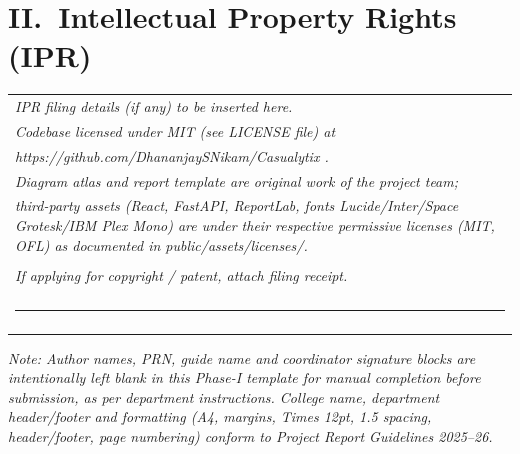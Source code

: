 \documentclass[12pt,a4paper,oneside]{report}
\newcommand{\blankline}[1][3cm]{\rule{#1}{0.4pt}}
\begin{document}
\section*{II.\ Intellectual Property Rights (IPR)}

\begin{center}
\begin{tabular}{|p{14cm}|}
\hline
\textit{IPR filing details (if any) to be inserted here.}\\
\textit{Codebase licensed under MIT (see LICENSE file) at}\\
\textit{https://github.com/DhananjaySNikam/Casualytix .}\\
\textit{Diagram atlas and report template are original work of the project team;}\\
\textit{third-party assets (React, FastAPI, ReportLab, fonts Lucide/Inter/Space Grotesk/IBM Plex Mono) are under their respective permissive licenses (MIT, OFL) as documented in public/assets/licenses/.}\\
\\
\textit{If applying for copyright / patent, attach filing receipt.}\\
\\
\blankline[14cm] \\
\\
\hline
\end{tabular}
\end{center}

\vspace{0.5cm}
\noindent\small \textit{Note: Author names, PRN, guide name and coordinator signature blocks are intentionally left blank in this Phase-I template for manual completion before submission, as per department instructions. College name, department header/footer and formatting (A4, margins, Times 12pt, 1.5 spacing, header/footer, page numbering) conform to Project Report Guidelines 2025--26.}
\end{document}
